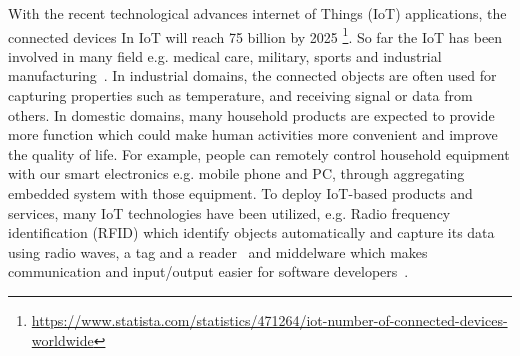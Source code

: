 


\begin{comment} %
                
                |- IoT
- Constant -----|- WSNs sensors
                |- streaming data, data analysis
                |- Embedded system
                
- Problem  -----|- power consuming, radio transmission is power-hungry

                
- goal, motive -|- motivation: try to extend the work time of the Battery-powered devices 
                |- goal: Reduce rate of transmission of through data summarization

- contribution -|- Formalize the description of original LTC algorithm
                |- Extend LTC to dimension $n$.
                |- Propose an algebraic formulation of n-dimensional LTC algorithm.
                |- Introduce an norm-independent expression of n-dimensional LTC, according 
                |  to the algebraic formulation.
                |- Internship and publish
- outline
\end{comment}


With the recent technological advances internet of Things (IoT) applications,
the connected devices In IoT will reach 75 billion by 2025
\footnote{\url{https://www.statista.com/statistics/471264/iot-number-of-connected-devices-worldwide}}.
So far the IoT has been involved in many field e.g. medical care, military,
sports and industrial manufacturing~\cite{boudargham2017exhaustive,
lai2013survey, da2014internet}. In industrial domains, the connected objects are
often used for capturing properties such as temperature, and receiving signal or
data from others. In domestic domains, many household products are expected to
provide more function which could make human activities more convenient and
improve the quality of life. For example, people can remotely control household
equipment with our smart electronics e.g. mobile phone and PC, through
aggregating embedded system with those equipment.  To deploy IoT-based products
and services, many IoT technologies have been utilized, e.g. Radio frequency
identification (RFID) which identify objects automatically and capture its data
using radio waves, a tag and a reader~\cite{lee2015internet} and middelware
which makes communication and input/output easier for software
developers~\cite{lee2015internet}.


